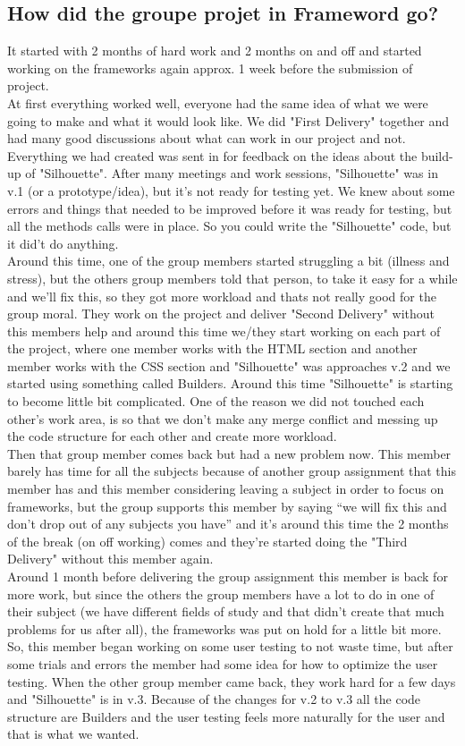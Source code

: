 \documentclass[12pt]{article}
\begin{document}
    \subsection{How did the groupe projet in Frameword go?}
    It started with 2 months of hard work and 2 months on and off and started working on the frameworks again approx. 1 week before the submission of project.\\
    At first everything worked well, everyone had the same idea of what we were going to make and what it would look like. We did "First Delivery" together and had many good discussions about what can work in our project and not. Everything we had created was sent in for feedback on the ideas about the build-up of "Silhouette". After many meetings and work sessions, "Silhouette" was in v.1 (or a prototype/idea), but it's not ready for testing yet. We knew about some errors and things that needed to be improved before it was ready for testing, but all the methods calls were in place. So you could write the "Silhouette" code, but it did't do anything.\\
    Around this time, one of the group members started struggling a bit (illness and stress), but the others group members told that person, to take it easy for a while and we'll fix this, so they got more workload and thats not really good for the group moral. They work on the project and deliver "Second Delivery" without this members help and around this time we/they start working on each part of the project, where one member works with the HTML section and another member works with the CSS section and "Silhouette" was approaches v.2 and we started using something called Builders. Around this time "Silhouette" is starting to become little bit complicated. One of the reason we did not touched each other's work area, is so that we don't make any merge conflict and messing up the code structure for each other and create more workload.\\
    Then that group member comes back but had a new problem now. This member barely has time for all the subjects because of another group assignment that this member has and this member considering leaving a subject in order to focus on frameworks, but the group supports this member by saying “we will fix this and don't drop out of any subjects you have” and it's around this time the 2 months of the break (on off working) comes and they're started doing the "Third Delivery" without this member again.\\
    Around 1 month before delivering the group assignment this member is back for more work, but since the others the group members have a lot to do in one of their subject (we have different fields of study and that didn't create that much problems for us after all), the frameworks was put on hold for a little bit more. So, this member began working on some user testing to not waste time, but after some trials and errors the member had some idea for how to optimize the user testing. When the other group member came back, they work hard for a few days and "Silhouette" is in v.3. Because of the changes for v.2 to v.3 all the code structure are Builders and the user testing feels more naturally for the user and that is what we wanted.
\end{document}
